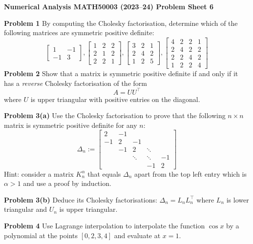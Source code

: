 \documentclass[12pt,a4paper]{article}
\def\endash{–}
\begin{document}
\textbf{Numerical Analysis MATH50003 (2023\ensuremath{\endash}24) Problem Sheet 6}

\textbf{Problem 1} By computing the Cholesky factorisation, determine which of the following matrices are symmetric positive definite:
\[
\begin{bmatrix} 1 & -1  \\
-1 & 3
\end{bmatrix}, \begin{bmatrix} 1 & 2 & 2  \\
2 & 1 & 2\\
2 & 2 & 1
\end{bmatrix}, \begin{bmatrix} 3 & 2 & 1  \\
2 & 4 & 2\\
1 & 2 & 5
\end{bmatrix}, 
\begin{bmatrix} 4 & 2 & 2 & 1  \\
2 & 4 & 2 & 2\\
2 & 2 & 4 & 2 \\
1 & 2 & 2 & 4
\end{bmatrix}
\]
\textbf{Problem 2} Show that a matrix is symmetric positive definite if and only if it has a \emph{reverse} Cholesky factorisation of the form
\[
A = U U^\ensuremath{\top}
\]
where $U$ is upper triangular with positive entries on the diagonal.

\textbf{Problem 3(a)} Use the Cholesky factorisation to prove that the following $n \ensuremath{\times} n$ matrix is symmetric positive definite for any $n$:
\[
\ensuremath{\Delta}_n := \begin{bmatrix}
2 & -1 \\
-1 & 2 & -1 \\
& -1 & 2 & \ensuremath{\ddots} \\
&& \ensuremath{\ddots} & \ensuremath{\ddots} & -1 \\
&&& -1 & 2
\end{bmatrix}
\]
Hint: consider a matrix $K_n^\ensuremath{\alpha}$ that equals $\ensuremath{\Delta}_n$ apart from the top left entry which is $\ensuremath{\alpha} > 1$ and use a proof by induction.

\textbf{Problem 3(b)}  Deduce its Cholesky factorisations: $\ensuremath{\Delta}_n = L_n L_n^\ensuremath{\top}$ where $L_n$ is lower triangular and $U_n$ is upper triangular.

\textbf{Problem 4} Use Lagrange interpolation to interpolate the function $\cos x$ by a polynomial at the points $[0,2,3,4]$ and evaluate at $x = 1$. 
\end{document}
